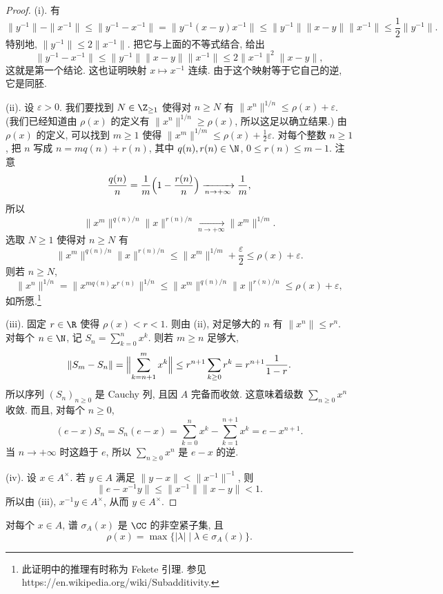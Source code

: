 \begin{proof}
(i). 有
\[
\|y^{-1}\| - \|x^{-1}\| \leq \|y^{-1} - x^{-1}\| = \|y^{-1}(x - y)x^{-1}\| \leq \|y^{-1}\|\|x - y\|\|x^{-1}\| \leq \frac{1}{2}\|y^{-1}\|.
\]
特别地, $\|y^{-1}\| \leq 2\|x^{-1}\|$. 把它与上面的不等式结合, 给出
\[
\|y^{-1} - x^{-1}\| \leq \|y^{-1}\|\|x - y\|\|x^{-1}\| \leq 2\|x^{-1}\|^2\|x - y\|,
\]
这就是第一个结论. 这也证明映射 $x \longmapsto x^{-1}$ 连续. 由于这个映射等于它自己的逆, 它是同胚.

(ii). 设 $\varepsilon > 0$. 我们要找到 $N \in \Z_{\geq 1}$ 使得对 $n \geq N$ 有 $\|x^n\|^{1/n} \leq \rho(x) + \varepsilon$. (我们已经知道由 $\rho(x)$ 的定义有 $\|x^n\|^{1/n} \geq \rho(x)$, 所以这足以确立结果.) 由 $\rho(x)$ 的定义, 可以找到 $m \geq 1$ 使得 $\|x^m\|^{1/m} \leq \rho(x) + \frac{1}{2}\varepsilon$. 对每个整数 $n \geq 1$, 把 $n$ 写成 $n = mq(n) + r(n)$, 其中 $q(n), r(n) \in \N$, $0 \leq r(n) \leq m - 1$. 注意
\[
\frac{q(n)}{n} = \frac{1}{m}\Bigl(1 - \frac{r(n)}{n}\Bigr) \xrightarrow[n \to +\infty]{} \frac{1}{m},
\]
所以
\[
\|x^m\|^{q(n)/n}\|x\|^{r(n)/n} \xrightarrow[n \to +\infty]{} \|x^m\|^{1/m}.
\]
选取 $N \geq 1$ 使得对 $n \geq N$ 有
\[
\|x^m\|^{q(n)/n}\|x\|^{r(n)/n} \leq \|x^m\|^{1/m} + \frac{\varepsilon}{2} \leq \rho(x) + \varepsilon.
\]
则若 $n \geq N$,
\[
\|x^n\|^{1/n} = \|x^{mq(n)}x^{r(n)}\|^{1/n} \leq \|x^m\|^{q(n)/n}\|x\|^{r(n)/n} \leq \rho(x) + \varepsilon,
\]
如所愿.\footnote{此证明中的推理有时称为 Fekete 引理. 参见 https://en.wikipedia.org/wiki/Subadditivity.}

(iii). 固定 $r \in \R$ 使得 $\rho(x) < r < 1$. 则由 (ii), 对足够大的 $n$ 有 $\|x^n\| \leq r^n$. 对每个 $n \in \N$, 记 $S_n = \sum_{k=0}^n x^k$. 则若 $m \geq n$ 足够大,
\[
\|S_m - S_n\| = \Bigl\|\sum_{k=n+1}^m x^k\Bigr\| \leq r^{n+1}\sum_{k \geq 0}r^k = r^{n+1}\frac{1}{1-r}.
\]
所以序列 $(S_n)_{n \geq 0}$ 是 Cauchy 列, 且因 $A$ 完备而收敛. 这意味着级数 $\sum_{n \geq 0}x^n$ 收敛. 而且, 对每个 $n \geq 0$,
\[
(e - x)S_n = S_n(e - x) = \sum_{k=0}^n x^k - \sum_{k=1}^{n+1}x^k = e - x^{n+1}.
\]
当 $n \to +\infty$ 时这趋于 $e$, 所以 $\sum_{n \geq 0}x^n$ 是 $e - x$ 的逆.

(iv). 设 $x \in A^{\times}$. 若 $y \in A$ 满足 $\|y - x\| < \|x^{-1}\|^{-1}$, 则
\[
\|e - x^{-1}y\| \leq \|x^{-1}\|\|x - y\| < 1.
\]
所以由 (iii), $x^{-1}y \in A^{\times}$, 从而 $y \in A^{\times}$.
\end{proof}

\begin{theorem}[谱的非空紧致性]
\label{thm:II.1.1.3}
对每个 $x \in A$, 谱 $\sigma_A(x)$ 是 $\CC$ 的非空紧子集, 且
\[
\rho(x) = \max\{|\lambda| \mid \lambda \in \sigma_A(x)\}.
\]
\end{theorem}

